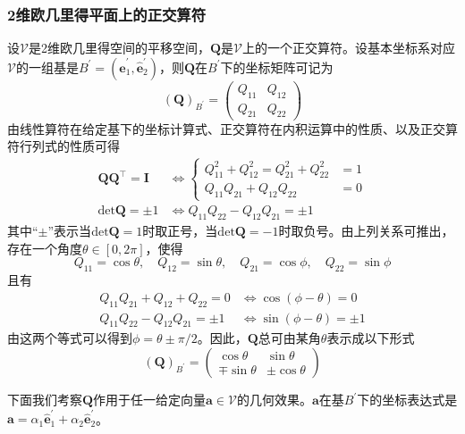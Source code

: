 \documentclass[../main.tex]{subfiles}
\begin{document}
\subsubsection{2维欧几里得平面上的正交算符}
设$\mathcal{V}$是2维欧几里得空间的平移空间，$\mathbf{Q}$是$\mathcal{V}$上的一个正交算符。设基本坐标系对应$\mathcal{V}$的一组基是$B^\prime=\left(\mathbf{\hat{e}}^\prime_1,\mathbf{\hat{e}}^\prime_2\right)$，则$\mathbf{Q}$在$B^\prime$下的坐标矩阵可记为
\[\left(\mathbf{Q}\right)_{B^\prime}=\left(\begin{array}{cc}Q_{11}&Q_{12}\\Q_{21}&Q_{22}\end{array}\right)\]
由线性算符在给定基下的坐标计算式、正交算符在内积运算中的性质、以及正交算符行列式的性质可得
\begin{align*}
    \mathbf{QQ}^\intercal=\mathbf{I} & \Leftrightarrow
    \left\{\begin{aligned}Q_{11}^2+Q_{12}^2=Q_{21}^2+Q_{22}^2 & =1 \\
               Q_{11}Q_{21}+Q_{12}Q_{22}           & =0\end{aligned}\right.                  \\
    \mathrm{det}\mathbf{Q}=\pm 1     & \Leftrightarrow Q_{11}Q_{22}-Q_{12}Q_{21}  =\pm 1
\end{align*}
其中“$\pm$”表示当$\mathrm{det}\mathbf{Q}=1$时取正号，当$\mathrm{det}\mathbf{Q}=-1$时取负号。由上列关系可推出，存在一个角度$\theta\in\left[0,2\pi\right]$，使得
\[Q_{11}=\cos\theta,\quad Q_{12}=\sin\theta,\quad Q_{21}=\cos\phi,\quad Q_{22}=\sin\phi\]
且有
\begin{align*}
    Q_{11}Q_{21}+Q_{12}+Q_{22}  =0    & \Leftrightarrow\cos\left(\phi-\theta\right)=0     \\
    Q_{11}Q_{22}-Q_{12}Q_{21}  =\pm 1 & \Leftrightarrow\sin\left(\phi-\theta\right)=\pm 1
\end{align*}
由这两个等式可以得到$\phi=\theta\pm\pi/2$。因此，$\mathbf{Q}$总可由某角$\theta$表示成以下形式
\[\left(\mathbf{Q}\right)_{B^\prime}=\left(\begin{array}{cc}\cos\theta&\sin\theta\\\mp\sin\theta&\pm\cos\theta\end{array}\right)\]

下面我们考察$\mathbf{Q}$作用于任一给定向量$\mathbf{a}\in\mathcal{V}$的几何效果。$\mathbf{a}$在基$B^\prime$下的坐标表达式是$\mathbf{a}=\alpha_1\mathbf{\hat{e}}^\prime_1+\alpha_2\mathbf{\hat{e}}^\prime_2$。
\end{document}
